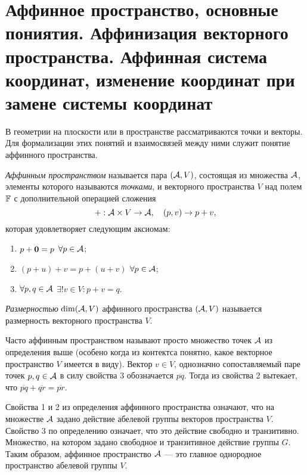 \section{Аффинное пространство, основные пониятия. Аффинизация векторного пространства. Аффинная система координат, изменение координат при замене системы координат}

В геометрии на плоскости или в пространстве рассматриваются точки и векторы. Для формализации этих понятий и взаимосвязей между ними служит понятие аффинного пространства.

\begin{definition}
    \textit{Аффинным пространством} называется пара $(\mathcal{A}, V)$, состоящая из множества $\mathcal{A}$, элементы которого называются \textit{точками}, и векторного пространства $V$ над полем $\mathbb{F}$ с дополнительной операцией сложения
    \[
        +: \mathcal{A} \times V \to \mathcal{A},\quad (p, v) \to p + v,
    \]
    которая удовлетворяет следующим аксиомам:
    \begin{enumerate}[nolistsep]
        \item $p + \boldsymbol{0} = p$ $\forall p \in \mathcal{A}$;
        \item $(p + u) + v = p + (u + v)$ $\forall p \in \mathcal{A}$;
        \item $\forall p, q \in \mathcal{A}$ $\exists!v \in V : p + v = q$.
    \end{enumerate}

    \textit{Размерностью} $\dim(\mathcal{A}, V)$ аффинного пространства $(\mathcal{A}, V)$ называется размерность векторного пространства $V$.
\end{definition}

Часто аффинным пространством называют просто множество точек $\mathcal{A}$ из определения выше (особено когда из контектса понятно, какое векторное пространство $V$ имеется в виду). Вектор $v \in V$, однозначно сопоставляемый паре точек $p, q \in \mathcal{A}$ в силу свойства 3 обозначается $\overline{pq}$. Тогда из свойства 2 вытекает, что $\overline{pq} + \overline{qr} = \overline{pr}$.

\begin{remark}
    Свойства 1 и 2 из определения аффинного пространства означают, что на множестве $\mathcal{A}$ задано действие абелевой группы векторов пространства $V$. Свойство 3 по определению означает, что это действие свободно и транзитивно. Множество, на котором задано свободное и транзитивное действие группы $G$. Таким образом, аффинное пространство $\mathcal{A}$ --- это главное однородное пространство абелевой группы $V$.
\end{remark}

